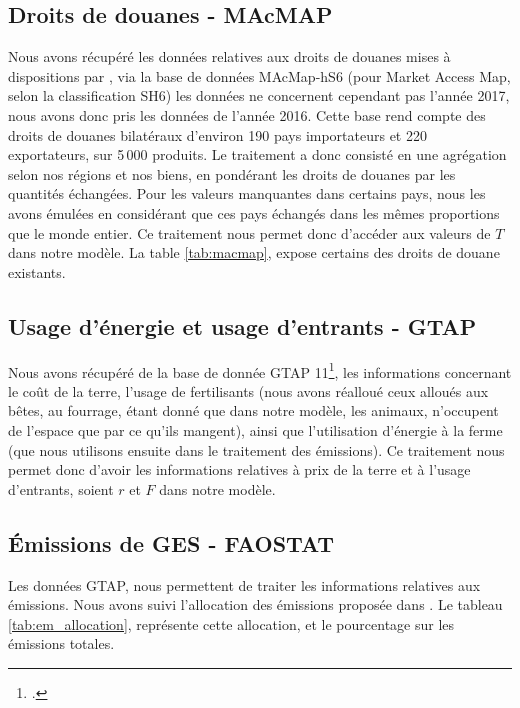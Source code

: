 \subsection{Droits de douanes - MAcMAP}

Nous avons récupéré les données relatives aux droits de douanes mises à dispositions par \cite{Guimbard2012}, via la base de données MAcMap-hS6 (pour Market Access Map, selon la classification SH6) les données ne concernent cependant pas l'année 2017, nous avons donc pris les données de l'année 2016. Cette base rend compte des droits de douanes bilatéraux d'environ 190 pays importateurs et 220 exportateurs, sur 5\,000 produits. Le traitement a donc consisté en une agrégation selon nos régions et nos biens, en pondérant les droits de douanes par les quantités échangées. Pour les valeurs manquantes dans certains pays, nous les avons émulées en considérant que ces pays échangés dans les mêmes proportions que le monde entier. Ce traitement nous permet donc d'accéder aux valeurs de $T$ dans notre modèle. La table \ref{tab:macmap}, expose certains des droits de douane existants.



\subsection{Usage d'énergie et usage d'entrants - GTAP}

Nous avons récupéré de la base de donnée GTAP 11\footcite{Aguiar2022}, les informations concernant le coût de la terre, l'usage de fertilisants (nous avons réalloué ceux alloués aux bêtes, au fourrage, étant donné que dans notre modèle, les animaux, n'occupent de l'espace que par ce qu'ils mangent), ainsi que l'utilisation d'énergie à la ferme (que nous utilisons ensuite dans le traitement des émissions). Ce traitement nous permet donc d'avoir les informations relatives à prix de la terre et à l'usage d'entrants, soient $r$ et $F$ dans notre modèle.


\subsection{Émissions de GES - FAOSTAT}

Les données GTAP, nous permettent de traiter les informations relatives aux émissions. Nous avons suivi l'allocation des émissions proposée dans \cite{Valin2023}. Le tableau \ref{tab:em_allocation}, représente cette allocation, et le pourcentage sur les émissions totales.

